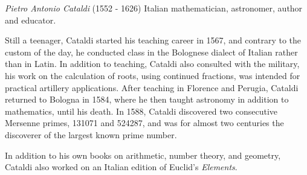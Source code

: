 \documentclass[12pt]{article}
\begin{document}
\emph{Pietro Antonio Cataldi} (1552 - 1626) Italian mathematician, astronomer, author and educator.

Still a teenager, Cataldi started his teaching career in 1567, and contrary to the custom of the day, he conducted class in the Bolognese dialect of Italian rather than in Latin. In addition to teaching, Cataldi also consulted with the military, his work on the calculation of roots, using continued fractions, was intended for practical artillery applications. After teaching in Florence and Perugia, Cataldi returned to Bologna in 1584, where he then taught astronomy in addition to mathematics, until his death. In 1588, Cataldi discovered two consecutive Mersenne primes, 131071 and 524287, and was for almost two centuries the discoverer of the largest known prime number.

In addition to his own books on arithmetic, number theory, and geometry, Cataldi also worked on an Italian edition of Euclid's {\it Elements}.
\end{document}
